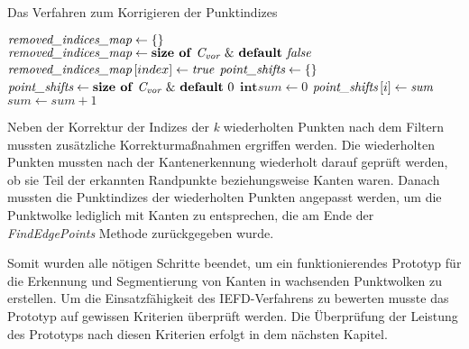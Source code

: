 \begin{algorithm}
	\caption{Das Verfahren zum Korrigieren der Punktindizes}
	\label{alg: mark_points}
	\begin{algorithmic}[1]
		\State $\textit{removed\textunderscore indices\textunderscore map} \gets \text{\{\}}$
		\State $\textit{removed\textunderscore indices\textunderscore map} \gets \text{\textbf{size of} \textit{C\textsubscript{vor}} \& \textbf{default} \textit{false}}$
		\State $\textit{removed\textunderscore indices\textunderscore map} \left[index\right] \gets \textit{true}$
		\EndFor
		\State $\textit{point\textunderscore shifts} \gets \text{\{\}}$
		\State $\textit{point\textunderscore shifts} \gets \text{\textbf{size of} \textit{C\textsubscript{vor}} \& \textbf{default} 0}$
		\State $\textbf{int} \textit{sum} \gets 0$
		\State $\textit{point\textunderscore shifts}\left[i\right] \gets \textit{sum}$
		\Else
		\State $\textit{sum} \gets \textit{sum} + 1$
		\EndIf
		\EndFor
		\EndFunction
	\end{algorithmic}
\end{algorithm}

Neben der Korrektur der Indizes der \textit{k} wiederholten Punkten nach dem Filtern mussten zusätzliche Korrekturmaßnahmen ergriffen werden. Die wiederholten Punkten mussten nach der Kantenerkennung wiederholt darauf geprüft werden, ob sie Teil der erkannten Randpunkte beziehungsweise Kanten waren. Danach mussten die Punktindizes der wiederholten Punkten angepasst werden, um die Punktwolke lediglich mit Kanten zu entsprechen, die am Ende der \textit{FindEdgePoints} Methode zurückgegeben wurde.

Somit wurden alle nötigen Schritte beendet, um ein funktionierendes Prototyp für die Erkennung und Segmentierung von Kanten in wachsenden Punktwolken zu erstellen. Um die Einsatzfähigkeit des IEFD-Verfahrens zu bewerten musste das Prototyp auf gewissen Kriterien überprüft werden. Die Überprüfung der Leistung des Prototyps nach diesen Kriterien erfolgt in dem nächsten Kapitel.